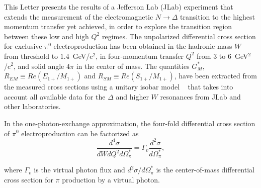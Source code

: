 \documentclass[aps,prl,twocolumn,superscriptaddress]{revtex4}
\newcommand{\Dfrac}[2]{\frac{\displaystyle #1}{\displaystyle #2}}
\begin{document}
This Letter presents the results of a Jefferson Lab (JLab) experiment  
that extends the measurement of the electromagnetic $N\to\Delta$ transition 
to the highest momentum transfer yet achieved, in order to explore the 
transition region between these low and high $Q^2$ regimes. The unpolarized 
differential cross section for exclusive $\pi^0$ electroproduction has been 
obtained in the hadronic mass $W$ from threshold to $1.4$~GeV/c$^2$, in 
four-momentum transfer $Q^2$ from $3$ to $6$~GeV$^2$/c$^2$, and solid angle 
$4\pi$ in the center of mass.  
The quantities  $G^*_M$, $R_{EM}\equiv Re(E_{1+}/M_{1+})$ and 
$R_{SM}\equiv Re(S_{1+}/M_{1+})$, have been extracted from the 
measured cross sections using a unitary isobar model ~\cite{bib:Inna} that 
takes into account all available data for the $\Delta$ and higher $W$ 
resonances from JLab and other laboratories. 


In the one-photon-exchange approximation, the four-fold differential cross 
section of $\pi^0$ electroproduction can be factorized as
$$ 
\Dfrac{d^4\sigma}{dWdQ^{ 2}d\Omega^*_{\pi}} =
 \Gamma_v \Dfrac{d^2\sigma}{d\Omega^*_{\pi}},
$$

where $\Gamma_v$ is the virtual photon flux and  
$d^2\sigma / d\Omega^*_{\pi}$ is the center-of-mass differential 
cross section for $\pi$ production by a virtual photon. 

\end{document}
